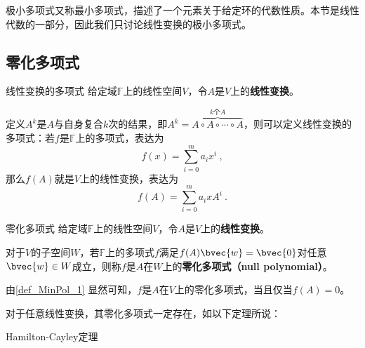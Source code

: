 



极小多项式又称最小多项式，描述了一个元素关于给定环的代数性质。本节是线性代数的一部分，因此我们只讨论线性变换的极小多项式。


\subsection{零化多项式}





\begin{definition}{线性变换的多项式}
给定域$\mathbb{F}$上的线性空间$V$，令$A$是$V$上的\textbf{线性变换}。

定义$A^k$是$A$与自身复合$k$次的结果，即$A^k=\overbrace{A\circ A\circ\cdots\circ A}^{k\text{个}A}$，则可以定义线性变换的多项式：若$f$是$\mathbb{F}$上的多项式，表达为
\begin{equation}
f(x) = \sum_{i=0}^m a_ix^i~, 
\end{equation}
那么$f(A)$就是$V$上的线性变换，表达为
\begin{equation}
f(A) = \sum_{i=0}^m a_ixA^i~. 
\end{equation}
\end{definition}



\begin{definition}{零化多项式}\label{def_MinPol_1}
给定域$\mathbb{F}$上的线性空间$V$，令$A$是$V$上的\textbf{线性变换}。

对于$V$的子空间$W$，若$\mathbb{F}$上的多项式$f$满足$f(A)\bvec{w}=\bvec{0}$对任意$\bvec{w}\in W$成立，则称$f$是$A$在$W$上的\textbf{零化多项式（null polynomial）}。
\end{definition}


由\autoref{def_MinPol_1} 显然可知，$f$是$A$在$V$上的零化多项式，当且仅当$f(A)=0$。


对于任意线性变换，其零化多项式一定存在，如以下定理所说：

\begin{theorem}{Hamilton-Cayley定理}

\end{theorem}
























